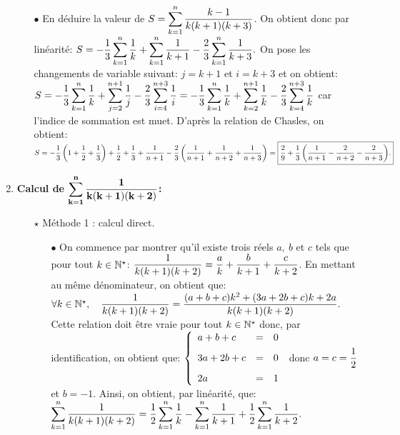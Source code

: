 \documentclass[a4paper, 11pt,reqno]{article}
\begin{document}
\begin{correction}
\begin{enumerate}
\begin{itemize}
\item[$\bullet$] En d\'eduire la valeur de $S=\displaystyle \sum\limits_{k=1}^{n}  \displaystyle\frac{k-1}{k(k+1)(k+3)}$. On obtient donc par lin\'earit\'e:
$S=-\displaystyle\frac{1}{3} \displaystyle \sum\limits_{k=1}^{n}  \displaystyle\frac{1}{k}+\displaystyle \sum\limits_{k=1}^{n}  \displaystyle\frac{1}{k+1}-\displaystyle\frac{2}{3}\displaystyle \sum\limits_{k=1}^{n}  \displaystyle\frac{1}{k+3}.$ On pose les changements de variable suivant: $j=k+1$ et $i=k+3$ et on obtient: 
$S=-\displaystyle\frac{1}{3} \displaystyle \sum\limits_{k=1}^{n}  \displaystyle\frac{1}{k}+\displaystyle \sum\limits_{j=2}^{n+1}  \displaystyle\frac{1}{j}-\displaystyle\frac{2}{3}\displaystyle \sum\limits_{i=4}^{n+3}  \displaystyle\frac{1}{i}=-\displaystyle\frac{1}{3} \displaystyle \sum\limits_{k=1}^{n}  \displaystyle\frac{1}{k}+\displaystyle \sum\limits_{k=2}^{n+1}  \displaystyle\frac{1}{k}-\displaystyle\frac{2}{3}\displaystyle \sum\limits_{k=4}^{n+3}  \displaystyle\frac{1}{k}$ car l'indice de sommation est muet. D'apr\`{e}s la relation de Chasles, on obtient: $S=-\displaystyle\frac{1}{3}  \left( 1+\displaystyle\frac{1}{2}+\displaystyle\frac{1}{3} \right)+\displaystyle\frac{1}{2}+\displaystyle\frac{1}{3}+\displaystyle\frac{1}{n+1}-\displaystyle\frac{2}{3}\left( \displaystyle\frac{1}{n+1}+\displaystyle\frac{1}{n+2}+\displaystyle\frac{1}{n+3}\right)=\fbox{$\displaystyle\frac{2}{9}+\displaystyle\frac{1}{3}\left( \displaystyle\frac{1}{n+1}-\displaystyle\frac{2}{n+2}-\displaystyle\frac{2}{n+3}\right)$.}$
\end{itemize}
\item  \textbf{Calcul de $\mathbf{\displaystyle \sum\limits_{k=1}^{n}  \displaystyle\frac{1}{k(k+1)(k+2)}}$:}\\
\begin{itemize}
\item[$\star$] M\'ethode 1 : calcul direct.
\begin{itemize}
\item[$\bullet$] On commence par montrer qu'il existe trois r\'eels $a,\ b$ et $c$ tels que pour tout $k\in\mathbb{N}^{\star}$: $\displaystyle\frac{1}{k(k+1)(k+2)}=\displaystyle\frac{a}{k}+\displaystyle\frac{b}{k+1}+\displaystyle\frac{c}{k+2}$. En mettant au m\^{e}me d\'enominateur, on obtient que: $\forall k\in\mathbb{N}^{\star},\quad \displaystyle\frac{1}{k(k+1)(k+2)}=\displaystyle\frac{  (a+b+c)k^2+(3a+2b+c)k+2a }{k(k+1)(k+2)}.$
Cette relation doit \^{e}tre vraie pour tout $k\in\mathbb{N}^{\star}$ donc, par identification, on obtient que: $\left\lbrace \begin{array}{lll}  a+b+c&=&0\vsec\\ 3a+2b+c&=&0\vsec\\ 2a&=&1  \end{array}\right.$ donc $a=c=\displaystyle\frac{1}{2}$ et $b=-1$. Ainsi, on obtient, par lin\'earit\'e, que: $\displaystyle \sum\limits_{k=1}^{n}  \displaystyle\frac{1}{k(k+1)(k+2)}=\displaystyle\frac{1}{2}\displaystyle \sum\limits_{k=1}^{n}  \displaystyle\frac{1}{k}-\displaystyle \sum\limits_{k=1}^{n} \displaystyle\frac{1}{k+1}+\displaystyle\frac{1}{2}\displaystyle \sum\limits_{k=1}^{n}  \displaystyle\frac{1}{k+2}.$

\end{itemize}
\end{itemize}
\end{enumerate}
\end{correction}
\end{document}
